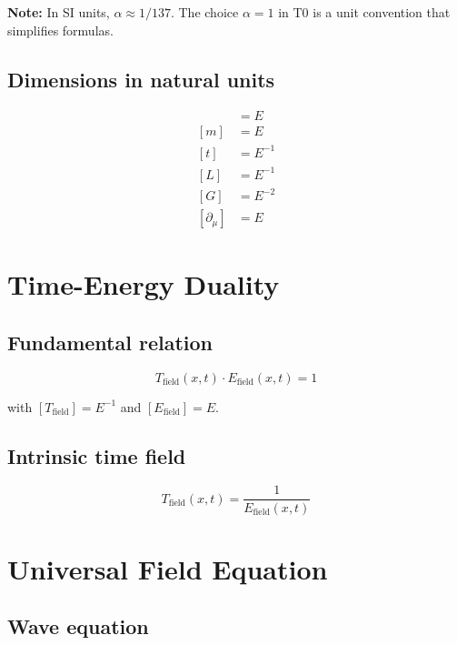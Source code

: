 	\textbf{Note:} In SI units, $\alpha \approx 1/137$. The choice $\alpha = 1$ in T0 is a unit convention that simplifies formulas.
	
	\subsection{Dimensions in natural units}
	
	\begin{align}
		[E] &= E \\
		[m] &= E \\
		[t] &= E^{-1} \\
		[L] &= E^{-1} \\
		[G] &= E^{-2} \\
		[\partial_\mu] &= E
	\end{align}
	
	\section{Time-Energy Duality}
	\label{sec:duality}
	
	\subsection{Fundamental relation}
	
	\begin{equation}
		T_{\text{field}}(x,t) \cdot E_{\text{field}}(x,t) = 1
		\label{eq:duality}
	\end{equation}
	
	with $[T_{\text{field}}] = E^{-1}$ and $[E_{\text{field}}] = E$.
	
	\subsection{Intrinsic time field}
	
	\begin{equation}
		T_{\text{field}}(x,t) = \frac{1}{E_{\text{field}}(x,t)}
	\end{equation}
	
	\section{Universal Field Equation}
	\label{sec:field_equation}
	
	\subsection{Wave equation}
	
